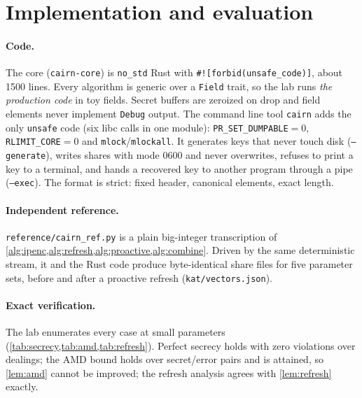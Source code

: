 \documentclass[10.5pt,a4paper]{article}
\theoremstyle{plain}
\theoremstyle{definition}
\newcommand{\code}[1]{\texttt{#1}}
\begin{document}
\section{Implementation and evaluation}\label{sec:evaluation}\label{sec:impl}

\paragraph{Code.} The core (\code{cairn-core}) is \code{no\_std} Rust with \code{\#![forbid(unsafe\_code)]}, about 1500 lines. Every algorithm is generic over a \code{Field} trait, so the lab runs \emph{the production code} in toy fields. Secret buffers are zeroized on drop and field elements never implement \code{Debug} output. The command line tool \code{cairn} adds the only \code{unsafe} code (six libc calls in one module): \code{PR\_SET\_DUMPABLE}$=0$, \code{RLIMIT\_CORE}$=0$ and \code{mlock}/\code{mlockall}. It generates keys that never touch disk (\code{--generate}), writes shares with mode 0600 and never overwrites, refuses to print a key to a terminal, and hands a recovered key to another program through a pipe (\code{--exec}). The format is strict: fixed header, canonical elements, exact length.

\paragraph{Independent reference.} \code{reference/cairn\_ref.py} is a plain big-integer transcription of \cref{alg:ipenc,alg:refresh,alg:proactive,alg:combine}. Driven by the same deterministic stream, it and the Rust code produce byte-identical share files for five parameter sets, before and after a proactive refresh (\code{kat/vectors.json}).

\paragraph{Exact verification.} The lab enumerates every case at small parameters (\cref{tab:secrecy,tab:amd,tab:refresh}). Perfect secrecy holds with zero violations over \SecrecyDealings{} dealings; the AMD bound holds over \AmdPairs{} secret/error pairs and is attained, so \cref{lem:amd} cannot be improved; the refresh analysis agrees with \cref{lem:refresh} exactly.
\end{document}
